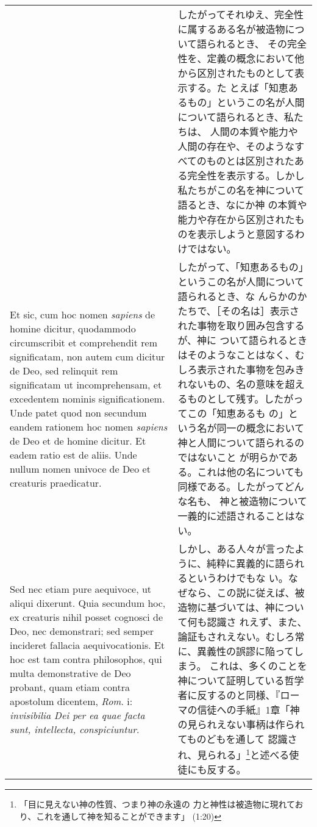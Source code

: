 \documentclass[10pt]{jsarticle}
\begin{document}
\begin{longtable}{p{21em}p{21em}}
&

したがってそれゆえ、完全性に属するある名が被造物について語られるとき、
その完全性を、定義の概念において他から区別されたものとして表示する。た
とえば「知恵あるもの」というこの名が人間について語られるとき、私たちは、
人間の本質や能力や人間の存在や、そのようなすべてのものとは区別されたあ
る完全性を表示する。しかし私たちがこの名を神について語るとき、なにか神
の本質や能力や存在から区別されたものを表示しようと意図するわけではない。

\\

Et sic, cum hoc nomen {\it sapiens} de homine dicitur, quodammodo
circumscribit et comprehendit rem significatam, non autem cum dicitur
de Deo, sed relinquit rem significatam ut incomprehensam, et
excedentem nominis significationem. Unde patet quod non secundum
eandem rationem hoc nomen {\it sapiens} de Deo et de homine
dicitur. Et eadem ratio est de aliis. Unde nullum nomen univoce de Deo
et creaturis praedicatur.

&

したがって、「知恵あるもの」というこの名が人間について語られるとき、な
んらかのかたちで、［その名は］表示された事物を取り囲み包含するが、神に
ついて語られるときはそのようなことはなく、むしろ表示された事物を包みき
れないもの、名の意味を超えるものとして残す。したがってこの「知恵あるも
の」という名が同一の概念において神と人間について語られるのではないこと
が明らかである。これは他の名についても同様である。したがってどんな名も、
神と被造物について一義的に述語されることはない。

\\

Sed nec etiam pure aequivoce, ut aliqui dixerunt. Quia secundum hoc,
ex creaturis nihil posset cognosci de Deo, nec demonstrari; sed semper
incideret fallacia aequivocationis. Et hoc est tam contra philosophos,
qui multa demonstrative de Deo probant, quam etiam contra apostolum
dicentem, {\it Rom}. {\sc i}: {\it invisibilia Dei per ea quae facta
sunt, intellecta, conspiciuntur}.

&

しかし、ある人々が言ったように、純粋に異義的に語られるというわけでもな
い。なぜなら、この説に従えば、被造物に基づいては、神について何も認識さ
れえず、また、論証もされえない。むしろ常に、異義性の誤謬に陥ってしまう。
これは、多くのことを神について証明している哲学者に反するのと同様、『ロー
マの信徒への手紙』1章「神の見られえない事柄は作られてものどもを通して
認識され、見られる」\footnote{「目に見えない神の性質、つまり神の永遠の
力と神性は被造物に現れており、これを通して神を知ることができます」
(1:20) }と述べる使徒にも反する。


\end{longtable}
\end{document}
